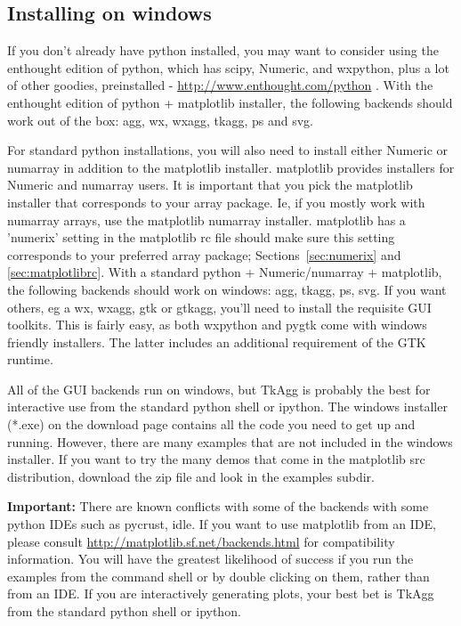 \documentclass[twoside]{book}
\begin{document}
    
\subsection{Installing on windows}

If you don't already have python installed, you may want to consider
using the enthought edition of python, which has scipy, Numeric, and
wxpython, plus a lot of other goodies, preinstalled -
\url{http://www.enthought.com/python} .  With the enthought edition of
python + matplotlib installer, the following backends should work out
of the box: agg, wx, wxagg, tkagg, ps and svg.

For standard python installations, you will also need to install
either Numeric or numarray in addition to the matplotlib installer.
matplotlib provides installers for Numeric and numarray users.  It is
important that you pick the matplotlib installer that corresponds to
your array package.  Ie, if you mostly work with numarray arrays, use
the matplotlib numarray installer.  matplotlib has a 'numerix' setting
in the matplotlib rc file should make sure this setting corresponds to
your preferred array package; Sections~\ref{sec:numerix} and
\ref{sec:matplotlibrc}. With a standard python + Numeric/numarray +
matplotlib, the following backends should work on windows: agg, tkagg,
ps, svg.  If you want others, eg a wx, wxagg, gtk or gtkagg, you'll
need to install the requisite GUI toolkits.  This is fairly easy, as
both wxpython and pygtk come with windows friendly installers.  The
latter includes an additional requirement of the GTK runtime.

All of the GUI backends run on windows, but TkAgg is probably the best
for interactive use from the standard python shell or ipython.  The
windows installer (*.exe) on the download page contains all the code
you need to get up and running.  However, there are many examples that
are not included in the windows installer.  If you want to try the
many demos that come in the matplotlib src distribution, download the
zip file and look in the examples subdir.

\textbf{Important:} There are known conflicts with some of the
backends with some python IDEs such as pycrust, idle.  If you want to
use matplotlib from an IDE, please consult
\url{http://matplotlib.sf.net/backends.html} for compatibility
information.  You will have the greatest likelihood of success if you
run the examples from the command shell or by double clicking on them,
rather than from an IDE.  If you are interactively generating plots,
your best bet is TkAgg from the standard python shell or ipython.
\end{document}
